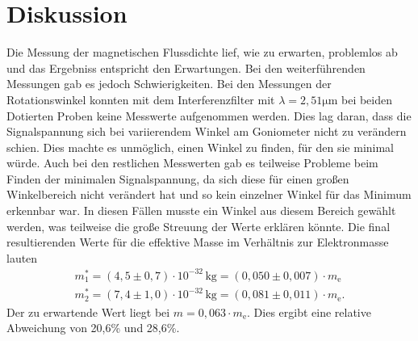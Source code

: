 \section{Diskussion}
\label{sec:Diskussion}


Die Messung der magnetischen Flussdichte lief, wie zu erwarten, problemlos ab und das Ergebniss entspricht den Erwartungen.\newline
\noindent
Bei den weiterführenden Messungen gab es jedoch Schwierigkeiten. Bei den Messungen der Rotationswinkel konnten mit dem Interferenzfilter mit $\lambda = 2,51 \si{\micro\metre}$ 
bei beiden Dotierten Proben keine Messwerte aufgenommen werden. Dies lag daran, dass die Signalspannung sich bei variierendem Winkel am Goniometer nicht zu verändern schien.
Dies machte es unmöglich, einen Winkel zu finden, für den sie minimal würde.
\newline
Auch bei den restlichen Messwerten gab es teilweise Probleme beim Finden der minimalen Signalspannung, da sich diese für einen großen Winkelbereich nicht verändert hat und so
kein einzelner Winkel für das Minimum erkennbar war. In diesen Fällen musste ein Winkel aus diesem Bereich gewählt werden, was teilweise die große Streuung der Werte erklären könnte.
\newline
Die final resultierenden Werte für die effektive Masse im Verhältnis zur Elektronmasse lauten
\begin{align*}
    m_1^* = (4,5 \pm 0,7) \cdot 10^{-32} \, \si{\kilo\gram} = (0,050 \pm 0,007) \cdot m_\text{e} \\
    m_2^* = (7,4 \pm 1,0) \cdot 10^{-32} \, \si{\kilo\gram} = (0,081 \pm 0,011) \cdot m_\text{e}.
\end{align*}
Der zu erwartende Wert liegt bei $m = 0,063 \cdot m_\text{e} $. Dies ergibt eine relative Abweichung von 20,6\% und 28,6\%.

